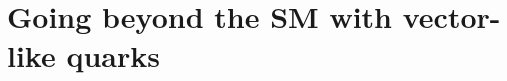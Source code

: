 

\section{Going beyond the SM with vector-like quarks}\label{sec:THvlq}

\cite{AguilarSaavedra:2009es,Martin:2009bg}
